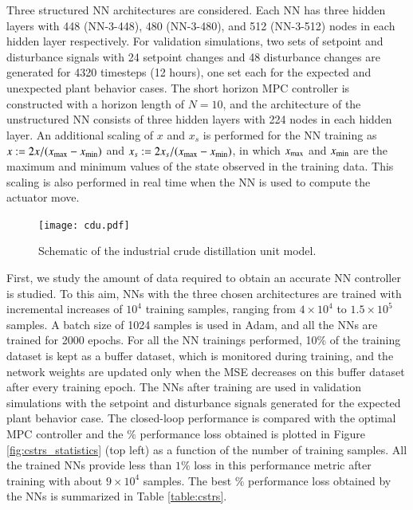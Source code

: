 \documentclass[preprint,5p, twocolumn, authoryear]{elsarticle}
\begin{document}
Three structured NN architectures are considered. Each NN has three hidden
layers with 448 (NN-3-448), 480 (NN-3-480), and 512 (NN-3-512) nodes in each
hidden layer respectively. For validation simulations, two sets of setpoint and
disturbance signals with 24 setpoint changes and 48 disturbance changes are
generated for 4320 timesteps (12 hours), one set each for the expected and
unexpected plant behavior cases. The short horizon MPC controller is constructed
with a horizon length of $N = 10$, and the architecture of the unstructured NN
consists of three hidden layers with 224 nodes in each hidden layer. An
additional scaling of $x$ and $x_s$ is performed for the NN training as $x :=
2x/(x_{\textnormal{max}} - x_{\textnormal{min}})$ and $x_s :=
2x_s/(x_{\textnormal{max}} - x_{\textnormal{min}})$, in which
$x_{\textnormal{max}}$ and $x_{\textnormal{min}}$ are the maximum and minimum
values of the state observed in the training data. This scaling is also
performed in real time when the NN is used to compute the actuator move. 

\begin{figure}[!h]
    \centering
    \texttt{[image: cdu.pdf]}
    \caption{Schematic of the industrial crude distillation unit model.}
    \label{fig:schematic_cdu}
\end{figure}

First, we study the amount of data required to obtain an accurate NN controller
is studied. To this aim, NNs with the three chosen architectures are trained
with incremental increases of $10^4$ training samples, ranging from $4 \times
10^4$ to $1.5 \times 10^5$ samples. A batch size of 1024 samples is used in
Adam, and all the NNs are trained for 2000 epochs. For all the NN trainings
performed, 10$\%$ of the training dataset is kept as a buffer dataset, which is
monitored during training, and the network weights are updated only when the MSE
decreases on this buffer dataset after every training epoch. The NNs after
training are used in validation simulations with the setpoint and disturbance
signals generated for the expected plant behavior case. The closed-loop
performance is compared with the optimal MPC controller and the $\%$ performance
loss obtained is plotted in Figure \ref{fig:cstrs_statistics} (top left) as a
function of the number of training samples. All the trained NNs provide less
than $1 \%$ loss in this performance metric after training with about $9 \times
10^4$ samples. The best $\%$ performance loss obtained by the NNs is summarized
in Table \ref{table:cstrs}. 
\end{document}
